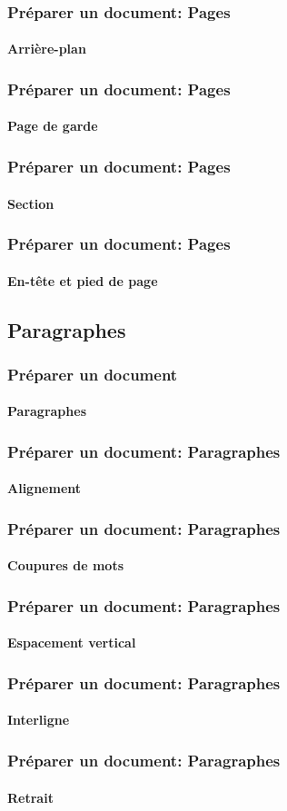 \documentclass[xcolor=table]{beamer}
\begin{document}
\begin{frame}
\frametitle{Préparer un document: Pages}
\framesubtitle{Arrière-plan}

\end{frame}

\begin{frame}
\frametitle{Préparer un document: Pages}
\framesubtitle{Page de garde}

\end{frame}

\begin{frame}
\frametitle{Préparer un document: Pages}
\framesubtitle{Section}

\end{frame}

\begin{frame}
\frametitle{Préparer un document: Pages}
\framesubtitle{En-tête et pied de page}

\end{frame}


\subsection{Paragraphes}

\begin{frame}
\frametitle{Préparer un document}
\framesubtitle{Paragraphes}

\end{frame}

\begin{frame}
\frametitle{Préparer un document: Paragraphes}
\framesubtitle{Alignement}

\end{frame}

\begin{frame}
\frametitle{Préparer un document: Paragraphes}
\framesubtitle{Coupures de mots}

\end{frame}

\begin{frame}
\frametitle{Préparer un document: Paragraphes}
\framesubtitle{Espacement vertical}

\end{frame}

\begin{frame}
\frametitle{Préparer un document: Paragraphes}
\framesubtitle{Interligne}

\end{frame}

\begin{frame}
\frametitle{Préparer un document: Paragraphes}
\framesubtitle{Retrait}

\end{frame}
\end{document}
